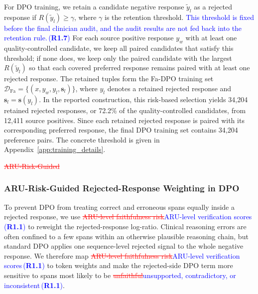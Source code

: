\documentclass[a4paper,fleqn,doubleblind]{cas-sc}
\DeclareRobustCommand{\deleted}[1]{\textcolor{red}{\sout{#1}}}
\DeclareRobustCommand{\added}[1]{\textcolor{blue}{#1}}
\DeclareRobustCommand{\revtag}[1]{\textcolor{blue}{\scriptsize\,(\textbf{#1})}}
\begin{document}
For DPO training, we retain a candidate negative response $\tilde{y}_l$ as a rejected response if $R(\tilde{y}_l)\ge \gamma$, where $\gamma$ is the retention threshold. \added{This threshold is fixed before the final clinician audit, and the audit results are not fed back into the retention rule.}\revtag{R1.7} For each source positive response $y_w$ with at least one quality-controlled candidate, we keep all paired candidates that satisfy this threshold; if none does, we keep only the paired candidate with the largest $R(\tilde{y}_l)$ so that each covered preferred response remains paired with at least one rejected response. The retained tuples form the Fa-DPO training set $\mathcal{D}_{\text{Fa}}=\{(x,y_w,y_l,\mathbf{s}_l)\}$, where $y_l$ denotes a retained rejected response and $\mathbf{s}_l=\mathbf{s}(y_l)$. In the reported construction, this risk-based selection yields 34,204 retained rejected responses, or 72.2\% of the quality-controlled candidates, from 12,411 source positives. Since each retained rejected response is paired with its corresponding preferred response, the final DPO training set contains 34,204 preference pairs. The concrete threshold is given in Appendix~\ref{app:training_details}.

\deleted{ARU-Risk-Guided}
\subsubsection{ARU-Risk-Guided Rejected-Response Weighting in DPO}
\label{sec:token_reweighting}

To prevent DPO from treating correct and erroneous spans equally inside a rejected response, we use \deleted{ARU-level faithfulness risk}\added{ARU-level verification scores}\revtag{R1.1} to reweight the rejected-response log-ratio. Clinical reasoning errors are often confined to a few spans within an otherwise plausible reasoning chain, but standard DPO applies one sequence-level rejected signal to the whole negative response. We therefore map \deleted{ARU-level faithfulness risk}\added{ARU-level verification scores}\revtag{R1.1} to token weights and make the rejected-side DPO term more sensitive to spans most likely to be \deleted{unfaithful}\added{unsupported, contradictory, or inconsistent}\revtag{R1.1}.
\end{document}
